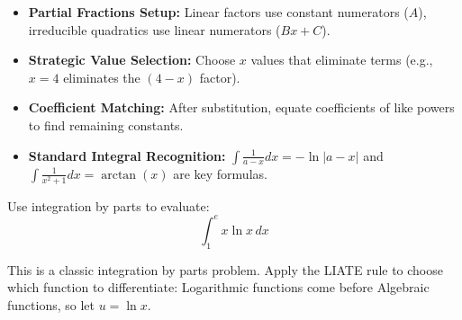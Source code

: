\begin{takeaways}
\begin{itemize}
\item \textbf{Partial Fractions Setup:} Linear factors use constant numerators ($A$), irreducible quadratics use linear numerators ($Bx + C$).
\item \textbf{Strategic Value Selection:} Choose $x$ values that eliminate terms (e.g., $x=4$ eliminates the $(4-x)$ factor).
\item \textbf{Coefficient Matching:} After substitution, equate coefficients of like powers to find remaining constants.
\item \textbf{Standard Integral Recognition:} $\int \frac{1}{a-x}dx = -\ln|a-x|$ and $\int \frac{1}{x^2+1}dx = \arctan(x)$ are key formulas.
\end{itemize}
\end{takeaways}


\begin{problem}
Use integration by parts to evaluate:
\[
\int_{1}^{e} x \ln x \, dx
\]
\end{problem}

\begin{hint}
This is a classic integration by parts problem. Apply the LIATE rule to choose which function to differentiate: Logarithmic functions come before Algebraic functions, so let $u = \ln x$.
\end{hint}

